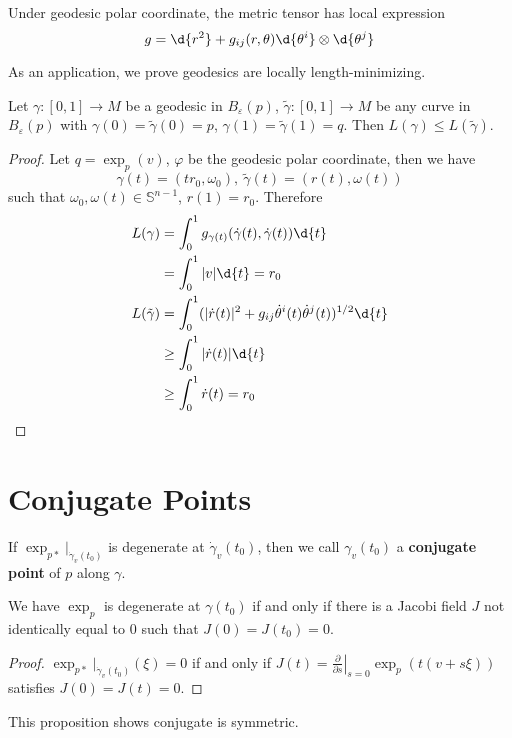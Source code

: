\begin{cor}
    Under geodesic polar coordinate, the metric tensor has local expression
    \[g=\d{r^2}+g_{ij}(r,\theta)\d{\theta^i}\otimes\d{\theta^j}\]
\end{cor}

As an application, we prove geodesics are locally length-minimizing.
\begin{prop}\label{locally length-min}
    Let $\gamma:[0,1]\to M$ be a geodesic in $B_\varepsilon(p)$, $\tilde{\gamma}:[0,1]\to M$ be any curve in $B_\varepsilon(p)$ with $\gamma(0)=\tilde{\gamma}(0)=p$, $\gamma(1)=\tilde{\gamma}(1)=q$.
    Then $L(\gamma)\leq L(\tilde{\gamma})$.
\end{prop}
\begin{proof}
    Let $q=\exp_p(v)$, $\varphi$ be the geodesic polar coordinate, then we have
    \[\gamma(t)=(tr_0,\omega_0),\ \tilde{\gamma}(t)=(r(t),\omega(t))\]
    such that $\omega_0,\omega(t)\in\mathbb{S}^{n-1}$, $r(1)=r_0$.
    Therefore
    \begin{align*}
        L(\gamma)&=\int_0^1g_{\gamma(t)}(\dot{\gamma}(t),\dot{\gamma}(t))\d{t}\\
        &=\int_0^1|v|\d{t}=r_0\\
        L(\tilde{\gamma})&=\int_0^1(|\dot{r}(t)|^2+g_{ij}\dot{\theta}^i(t)\dot{\theta}^j(t))^{1/2}\d{t}\\
        &\geq\int_0^1|\dot{r}(t)|\d{t}\\
        &\geq\int_0^1\dot{r}(t)=r_0\qedhere
    \end{align*}
\end{proof}

\section{Conjugate Points}

\begin{defn}
    If $\exp_{p*}|_{\dot{\gamma}_v(t_0)}$ is degenerate at $\dot{\gamma}_v(t_0)$, then we call $\gamma_v(t_0)$ a \textbf{conjugate point} of $p$ along $\gamma$.
\end{defn}

\begin{prop}
    We have $\exp_p$ is degenerate at $\gamma(t_0)$ if and only if there is a Jacobi field $J$ not identically equal to $0$ such that $J(0)=J(t_0)=0$.
\end{prop}
\begin{proof}
    $\exp_{p*}|_{\dot{\gamma}_v(t_0)}(\xi)=0$ if and only if $J(t)=\left.\frac{\partial{}}{\partial{s}}\right|_{s=0}\exp_p(t(v+s\xi))$ satisfies $J(0)=J(t)=0$.
\end{proof}

\begin{rem}
    This proposition shows conjugate is symmetric.
\end{rem}